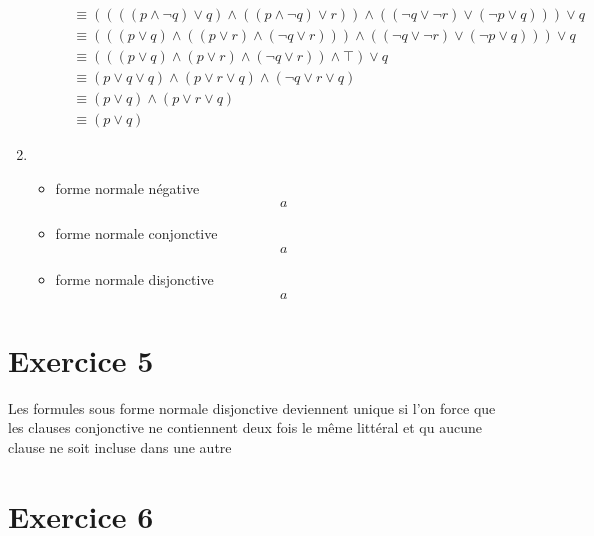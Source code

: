 \documentclass[12pt]{report}
\begin{document}
\begin{enumerate}
\begin{itemize}
\begin{align*}
          & \equiv ((((p \wedge \neg q) \vee q) \wedge ((p \wedge \neg q) \vee r)) \wedge ((\neg q \vee \neg r) \vee (\neg p \vee q))) \vee q\\
          & \equiv (((p \vee q) \wedge ((p \vee r) \wedge (\neg q \vee r))) \wedge ((\neg q \vee \neg r) \vee (\neg p \vee q))) \vee q\\
          & \equiv (((p \vee q) \wedge (p \vee r) \wedge (\neg q \vee r)) \wedge \top) \vee q\\
          & \equiv (p \vee q \vee q) \wedge (p \vee r \vee q) \wedge (\neg q \vee r \vee q)\\
          & \equiv (p \vee q) \wedge (p \vee r \vee q)\\
          & \equiv (p \vee q)
        \end{align*}
      \end{itemize}
      \item \begin{itemize}
          \item  forme normale négative
            \begin{align*}
                a
            \end{align*}
          \item  forme normale conjonctive
            \begin{align*}
              a
            \end{align*}
          \item forme normale disjonctive
            \begin{align*}
              a
            \end{align*}
          \end{itemize}
\end{enumerate}

\section{Exercice 5}
Les formules sous forme normale disjonctive deviennent unique si l'on force que les clauses conjonctive ne contiennent deux fois le même littéral et qu aucune clause ne soit incluse dans une autre



\section{Exercice 6}
\end{document}
